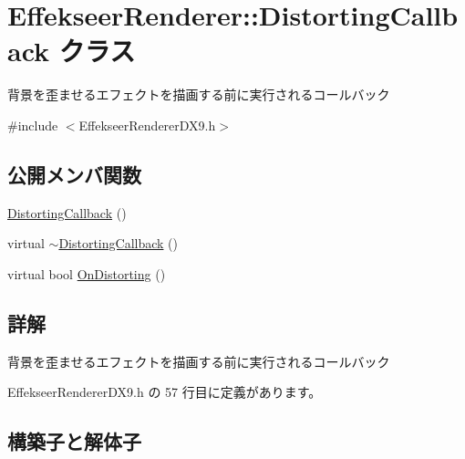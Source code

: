 \hypertarget{class_effekseer_renderer_1_1_distorting_callback}{}\section{Effekseer\+Renderer\+:\+:Distorting\+Callback クラス}
\label{class_effekseer_renderer_1_1_distorting_callback}


背景を歪ませるエフェクトを描画する前に実行されるコールバック  




{\ttfamily \#include $<$Effekseer\+Renderer\+D\+X9.\+h$>$}

\subsection*{公開メンバ関数}
\begin{DoxyCompactItemize}
\item 
\mbox{\hyperlink{class_effekseer_renderer_1_1_distorting_callback_a9f094ba92991cd124fa50b59807f53b4}{Distorting\+Callback}} ()
\item 
virtual \mbox{\hyperlink{class_effekseer_renderer_1_1_distorting_callback_ad773a6992bb498867c0f9304f27c8677}{$\sim$\+Distorting\+Callback}} ()
\item 
virtual bool \mbox{\hyperlink{class_effekseer_renderer_1_1_distorting_callback_a0fd8a141682f73cccdf9e744cd811041}{On\+Distorting}} ()
\end{DoxyCompactItemize}


\subsection{詳解}
背景を歪ませるエフェクトを描画する前に実行されるコールバック 

 Effekseer\+Renderer\+D\+X9.\+h の 57 行目に定義があります。



\subsection{構築子と解体子}
\mbox{\label{class_effekseer_renderer_1_1_distorting_callback_a9f094ba92991cd124fa50b59807f53b4}} 

